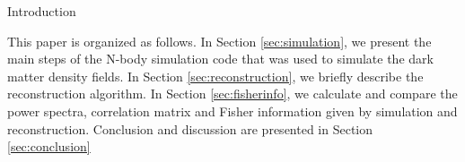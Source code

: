 \begin{section}{Introduction}

  This paper is organized as follows. 
  In Section \ref{sec:simulation}, we present the main steps of the N-body simulation code that was used to simulate the dark matter density fields.
  In Section \ref{sec:reconstruction}, we briefly describe the reconstruction algorithm.
  In Section \ref{sec:fisherinfo}, we calculate and compare the power spectra, correlation matrix and Fisher information given by simulation and reconstruction.
  Conclusion and discussion are presented in Section \ref{sec:conclusion}

\end{section}
